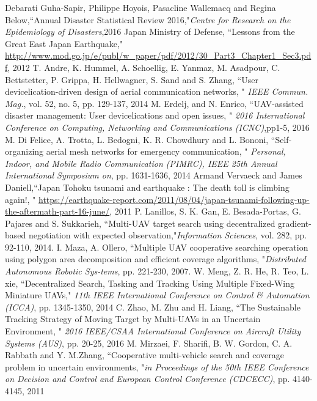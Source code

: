 \documentclass{ieeeaccess}
\begin{document}
\begin{thebibliography}{1}
Debarati Guha-Sapir, Philippe Hoyois, Pasacline Wallemacq and Regina Below,``Annual Disaster Statistical Review 2016,"\emph{Centre for Research on
the Epidemiology of Disasters},2016 
 Japan Ministry of Defense, ``Lessons from the Great East Japan Earthquake," \url{http://www.mod.go.jp/e/publ/w_paper/pdf/2012/30_Part3_Chapter1_Sec3.pdf}, 2012
 T. Andre, K. Hummel, A. Schoellig, E. Yanmaz, M. Asadpour, C. Bettstetter, P. Grippa, H. Hellwagner, S. Sand and S. Zhang, ``User devicelication-driven design of aerial communication networks, " \emph{IEEE Commun. Mag.}, vol. 52, no. 5, pp. 129-137, 2014
 M. Erdelj, and N. Enrico, ``UAV-assisted disaster management: User devicelications and open issues, " \emph{2016 International Conference on Computing, Networking and Communications (ICNC)},pp1-5, 2016
 M. Di Felice, A. Trotta, L. Bedogni, K. R. Chowdhury and L. Bononi, ``Self-organizing aerial mesh networks for emergency communication, " \emph{Personal, Indoor, and Mobile Radio Communication (PIMRC), IEEE 25th Annual International Symposium on}, pp. 1631-1636, 2014
Armand Vervaeck and James Daniell,``Japan Tohoku tsunami and earthquake : The death toll is climbing again!, " \url{https://earthquake-report.com/2011/08/04/japan-tsunami-following-up-the-aftermath-part-16-june/}, 2011
 P. Lanillos, S. K. Gan, E. Besada-Portas, G. Pajares and S. Sukkarieh, ``Multi-UAV target search using decentralized gradient-based negotiation with expected observation,"\emph{Information Sciences}, vol. 282, pp. 92-110, 2014.
 I. Maza, A. Ollero, ``Multiple UAV cooperative searching operation
using polygon area decomposition and efficient coverage algorithms, "\emph{Distributed Autonomous Robotic Sys-tems}, pp. 221-230, 2007.
 W. Meng, Z. R. He, R. Teo, L. xie, ``Decentralized Search, Tasking and Tracking Using Multiple Fixed-Wing Miniature UAVs," \emph{11th IEEE
International Conference on Control \& Automation (ICCA)}, pp. 1345-1350, 2014 
 C. Zhao, M. Zhu and H. Liang, ``The Sustainable Tracking Strategy of Moving Target by Multi-UAVs in an Uncertain Environment, " \emph{2016 IEEE/CSAA International Conference on Aircraft Utility Systems (AUS)}, pp. 20-25, 2016
 M. Mirzaei, F. Sharifi, B. W. Gordon, C. A. Rabbath and  Y. M.Zhang, ``Cooperative multi-vehicle search and coverage problem in uncertain environments, "\emph{in Proceedings of the 50th IEEE Conference on Decision and Control and European Control Conference (CDCECC)}, pp. 4140-4145, 2011

\end{thebibliography}
\end{document}
